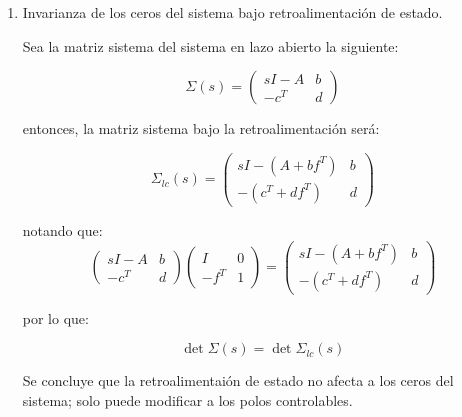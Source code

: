 \begin{enumerate}
            \item Invarianza de los ceros del sistema bajo retroalimentación de estado.

            Sea la matriz sistema del sistema en lazo abierto la siguiente:

            \begin{equation*}
                \Sigma(s) =
                \begin{pmatrix}
                    sI - A & b \\
                    -c^T & d
                \end{pmatrix}
            \end{equation*}

            entonces, la matriz sistema bajo la retroalimentación será:

            \begin{equation*}
                \Sigma_{lc}(s) =
                \begin{pmatrix}
                    sI - (A + b f^T) & b \\
                    -(c^T + d f^T) & d
                \end{pmatrix}
            \end{equation*}

            notando que:
            \begin{equation*}
                \begin{pmatrix}
                    sI - A & b \\
                    -c^T & d
                \end{pmatrix}
                \begin{pmatrix}
                    I & 0 \\
                    -f^T & 1
                \end{pmatrix} =
                \begin{pmatrix}
                    sI - (A + b f^T) & b \\
                    -(c^T + d f^T) & d
                \end{pmatrix}
            \end{equation*}

            por lo que:

            \begin{equation}
                \det{\Sigma(s)} = \det{\Sigma_{lc}(s)}
            \end{equation}

            Se concluye que la retroalimentaión de estado no afecta a los ceros del sistema; solo puede modificar a los polos controlables.
        \end{enumerate}

